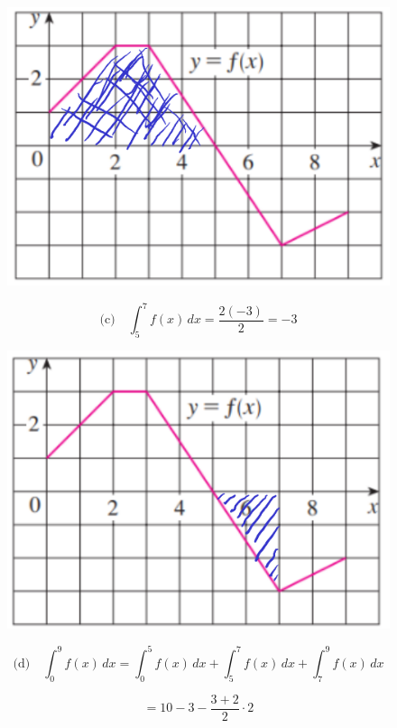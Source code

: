 \begin{figure}[H]
    \centering
    \includegraphics[scale=0.3]{images/integral3.png}
\end{figure}

\[
\text{(c)} \quad \int_{5}^{7} f(x)\,dx 
= \frac{2(-3)}{2} = -3
\]

\begin{figure}[H]
    \centering
    \includegraphics[scale=0.3]{images/integral4.png}
\end{figure}

\[
\text{(d)} \quad \int_{0}^{9} f(x)\,dx 
= \int_{0}^{5} f(x)\,dx + \int_{5}^{7} f(x)\,dx + \int_{7}^{9} f(x)\,dx
\]

\[
= 10 - 3 - \frac{3+2}{2} \cdot 2
\]

